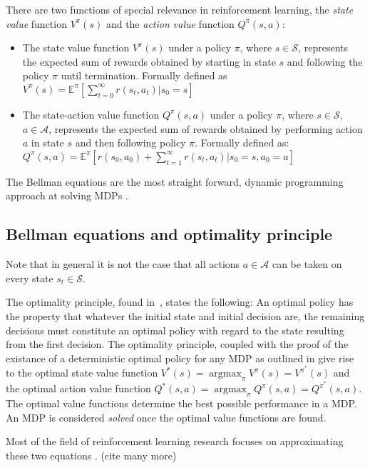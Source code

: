 \documentclass{../main.tex}{subfiles}
\begin{document}
There are two functions of special relevance in reinforcement learning, the \textit{state value} function $V^{\pi}(s)$ and the \textit{action value} function $Q^{\pi}(s, a)$:
\begin{itemize}
\item The state value function $V^{\pi}(s)$ under a policy $\pi$, where $s \in \mathcal{S}$, represents the expected sum of rewards obtained by starting in state $s$ and following the policy $\pi$ until termination. Formally defined as $V^{\pi}(s) = \mathbb{E}^{\pi}[\sum^{\infty}_{t=0} r(s_t, a_t) | s_0 = s] $
\item The state-action value function $Q^{\pi}(s, a)$ under a policy $\pi$, where $s \in \mathcal{S}$, $a \in \mathcal{A}$, represents the expected sum of rewards obtained by performing action $a$ in state $s$ and then following policy $\pi$. Formally defined as: $Q^{\pi}(s, a) = \mathbb{E}^{\pi}[r(s_0, a_0) + \sum^{\infty}_{t=1} r(s_t, a_t) | s_0 = s, a_0 = a]$
\end{itemize}

The Bellman equations are the most straight forward, dynamic programming approach at solving MDPs \citep{Bertsekas2007, Bellman1957}.

\subsection{Bellman equations and optimality principle}

Note that in general it is not the case that all actions $a \in \mathcal{A}$ can be taken on every state $s_t \in \mathcal{S}$.

The optimality principle, found in~\cite{Bellman1957}, states the following: An optimal policy has the property that whatever the initial state and initial decision are, the remaining decisions must constitute an optimal policy with regard to the state resulting from the first decision. The optimality principle, coupled with the proof of the existance of a deterministic optimal policy for any MDP as outlined in \citep{Borkar1988} give rise to the optimal state value function $V^{*}(s) = \operatorname*{argmax}_{\pi} V^{\pi}(s) = V^{\pi^{*}}(s)$ and the optimal action value function $Q^{*}(s,a) = \operatorname*{argmax}_{\pi} Q^{\pi}(s, a) = Q^{\pi^{*}}(s, a)$. The optimal value functions determine the best possible performance in a MDP\@. An MDP is considered \textit{solved} once the optimal value functions are found. 

Most of the field of reinforcement learning research focuses on approximating these two equations \citep{Tamar2017} \citep{Watkins1992} \citep{Mnih2013}. (cite many more)
\end{document}
